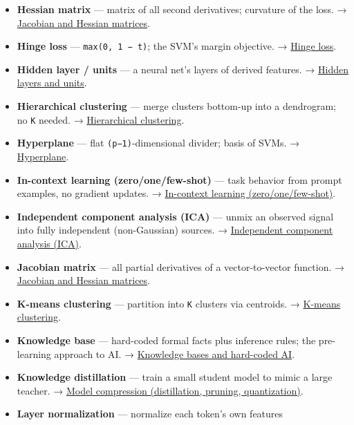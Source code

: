 \documentclass[
  10pt,
  letterpaper,
  onecolumn]{article}
\begin{document}
\begin{itemize}
{  feature encoding (hashing trick)}.
\item
  \textbf{Hessian matrix} --- matrix of all second derivatives;
  curvature of the loss. →
  \protect\hyperlink{jacobian-and-hessian-matrices}{Jacobian and Hessian
  matrices}.
\item
  \textbf{Hinge loss} --- \texttt{max(0,\ 1\ −\ t)}; the SVM's margin
  objective. → \protect\hyperlink{hinge-loss}{Hinge loss}.
\item
  \textbf{Hidden layer / units} --- a neural net's layers of derived
  features. → \protect\hyperlink{hidden-layers-and-units}{Hidden layers
  and units}.
\item
  \textbf{Hierarchical clustering} --- merge clusters bottom-up into a
  dendrogram; no \texttt{K} needed. →
  \protect\hyperlink{hierarchical-clustering}{Hierarchical clustering}.
\item
  \textbf{Hyperplane} --- flat \texttt{(p−1)}-dimensional divider; basis
  of SVMs. → \protect\hyperlink{hyperplane}{Hyperplane}.
\item
  \textbf{In-context learning (zero/one/few-shot)} --- task behavior
  from prompt examples, no gradient updates. →
  \protect\hyperlink{in-context-learning-zeroonefew-shot}{In-context
  learning (zero/one/few-shot)}.
\item
  \textbf{Independent component analysis (ICA)} --- unmix an observed
  signal into fully independent (non-Gaussian) sources. →
  \protect\hyperlink{independent-component-analysis-ica}{Independent
  component analysis (ICA)}.
\item
  \textbf{Jacobian matrix} --- all partial derivatives of a
  vector-to-vector function. →
  \protect\hyperlink{jacobian-and-hessian-matrices}{Jacobian and Hessian
  matrices}.
\item
  \textbf{K-means clustering} --- partition into \texttt{K} clusters via
  centroids. → \protect\hyperlink{k-means-clustering}{K-means
  clustering}.
\item
  \textbf{Knowledge base} --- hard-coded formal facts plus inference
  rules; the pre-learning approach to AI. →
  \protect\hyperlink{knowledge-bases-and-hard-coded-ai}{Knowledge bases
  and hard-coded AI}.
\item
  \textbf{Knowledge distillation} --- train a small student model to
  mimic a large teacher. →
  \protect\hyperlink{model-compression-distillation-pruning-quantization}{Model
  compression (distillation, pruning, quantization)}.
\item
  \textbf{Layer normalization} --- normalize each token's own features

\end{itemize}
\end{document}
